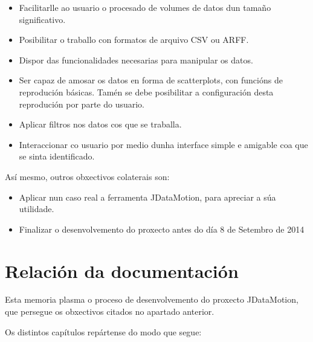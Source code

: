 \begin{itemize}
\item Facilitarlle ao usuario o procesado de volumes de datos dun tamaño significativo. 
\item Posibilitar o traballo con formatos de arquivo CSV ou ARFF. 
\item Dispor das funcionalidades necesarias para manipular os datos. 
\item Ser capaz de amosar os datos en forma de scatterplots, con funcións de reprodución básicas. Tamén se debe posibilitar a configuración desta reprodución por parte do usuario. 
\item Aplicar filtros nos datos cos que se traballa.
\item Interaccionar co usuario por medio dunha interface simple e amigable coa que se sinta identificado.
\end{itemize} 

Así mesmo, outros obxectivos colaterais son:

\begin{itemize}
\item Aplicar nun caso real a ferramenta JDataMotion, para apreciar a súa utilidade.
\item Finalizar o desenvolvemento do proxecto antes do día 8 de Setembro de 2014
\end{itemize} 

\section{Relación da documentación}

Esta memoria plasma o proceso de desenvolvemento do proxecto JDataMotion, que persegue os obxectivos citados no apartado anterior.

Os distintos capítulos repártense do modo que segue:

